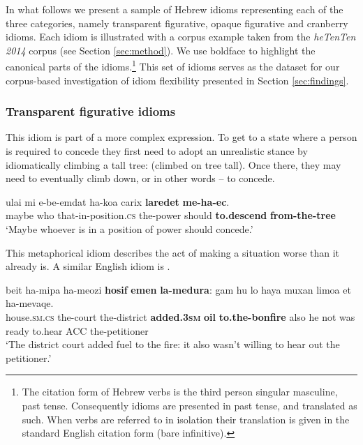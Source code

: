 \documentclass[output=paper]{langsci/langscibook}
\begin{document}
In what follows we present a sample of Hebrew idioms representing each of the three categories, namely transparent figurative, opaque figurative and cranberry idioms. Each idiom is illustrated with a corpus example taken from the \emph{heTenTen 2014} corpus (see Section \ref{sec:method}). We use boldface to highlight the canonical parts of the idioms.\footnote{The citation form of Hebrew verbs is the third person singular masculine,
past tense. Consequently idioms are presented in past tense, and translated as such. When verbs are referred to in isolation their translation is given in the standard English citation form (bare infinitive).} This set of idioms serves as the dataset for our corpus-based investigation of idiom flexibility presented in Section \ref{sec:findings}.

\subsubsection{Transparent figurative idioms}
\noindent{}
This idiom is part of a more complex expression. To get to a state where a person is required to concede they first need to adopt an unrealistic stance by idiomatically climbing a tall tree:  (climbed on tree tall). Once there, they may need to eventually climb down, or in other words -- to concede.


	\ea\label{ec-canon}
    	\gll {\alef}ulai mi {\shin}e-be-{\ayin}emdat ha-koa{\het} carix \textbf{laredet} \textbf{me-ha-{\ayin}ec}.\\
    	   maybe who that-in-position.\textsc{cs} the-power should \textbf{to.descend} \textbf{from-the-tree}\\
    	\glt `Maybe whoever is in a position of power should concede.'
	\z

\noindent{} This metaphorical idiom describes the act of making a situation worse than it already is. A similar English idiom is .

	\ea\label{medura-canon}
    	\gll beit ha-mi{\shin}pa{\tet} ha-me{\het}ozi \textbf{hosif} \textbf{{\shin}emen} \textbf{la-medura}: gam hu lo haya muxan li{\shin}mo{\ayin}a {\alef}et ha-mevaqe{\shin}.\\
    	   house.\textsc{sm}.\textsc{cs} the-court the-district \textbf{added.\textsc{3sm}} \textbf{oil} \textbf{to.the-bonfire} also he not was ready to.hear ACC the-petitioner\\
    	\glt `The district court added fuel to the fire: it also wasn't willing to hear out the petitioner.'
	\z
\end{document}
